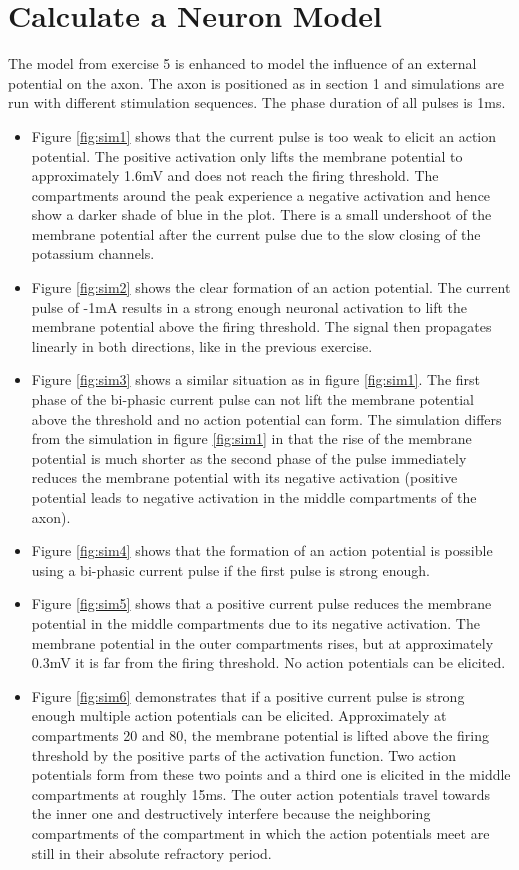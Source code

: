 \documentclass{scrartcl}
\begin{document}
\section{Calculate a Neuron Model}
The model from exercise 5 is enhanced to model the influence of an external potential on the axon. The axon is positioned as in section 1 and simulations are run with different stimulation sequences. The phase duration of all pulses is 1ms. 

\begin{itemize}
	\item Figure \ref{fig:sim1} shows that the current pulse is too weak to elicit an action potential. The positive activation only lifts the membrane potential to approximately 1.6mV and does not reach the firing threshold. The compartments around the peak experience a negative activation and hence show a darker shade of blue in the plot. There is a small undershoot of the membrane potential after the current pulse due to the slow closing of the potassium channels. 
	\item Figure \ref{fig:sim2} shows the clear formation of an action potential. The current pulse of -1mA results in a strong enough neuronal activation to lift the membrane potential above the firing threshold. The signal then propagates linearly in both directions, like in the previous exercise. 
	\item Figure \ref{fig:sim3} shows a similar situation as in figure \ref{fig:sim1}. The first phase of the bi-phasic current pulse can not lift the membrane potential above the threshold and no action potential can form. The simulation differs from the simulation in figure \ref{fig:sim1} in that the rise of the membrane potential is much shorter as the second phase of the pulse immediately reduces the membrane potential with its negative activation (positive potential leads to negative activation in the middle compartments of the axon). 
	\item Figure \ref{fig:sim4} shows that the formation of an action potential is possible using a bi-phasic current pulse if the first pulse is strong enough.
	\item Figure \ref{fig:sim5} shows that a positive current pulse reduces the membrane potential in the middle compartments due to its negative activation. The membrane potential in the outer compartments rises, but at approximately 0.3mV it is far from the firing threshold. No action potentials can be elicited. 
	\item Figure \ref{fig:sim6} demonstrates that if a positive current pulse is strong enough multiple action potentials can be elicited. Approximately at compartments 20 and 80, the membrane potential is lifted above the firing threshold by the positive parts of the activation function. Two action potentials form from these two points and a third one is elicited in the middle compartments at roughly 15ms. The outer action potentials travel towards the inner one and destructively interfere because the neighboring compartments of the compartment in which the action potentials meet are still in their absolute refractory period.
\end{itemize}
\end{document}
